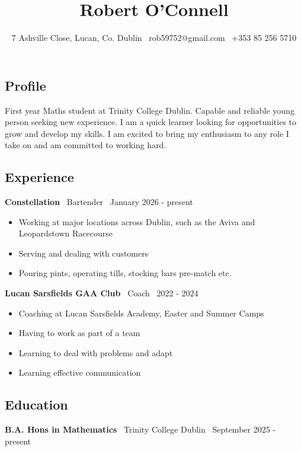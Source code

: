 \documentclass{article}
\title{\textbf{Robert O'Connell}}
\author{7 Ashville Close, Lucan, Co. Dublin \textbar \ rob59752@gmail.com \textbar \ +353 85 256 5710}
\date{}
\begin{document}
\maketitle

\subsection*{Profile}
First year Maths student at Trinity College Dublin. Capable and reliable young person seeking new experience. 
I am a quick learner looking for opportunities to grow and develop my skills. 
I am excited to bring my enthusiasm to any role I take on and am committed to working hard.

\subsection*{Experience}

\begin{small}
\textbf{Constellation} \textbar \ Bartender \textbar \ January 2026 - present
    \begin{itemize}
        \item Working at major locations across Dublin, such as the Aviva and Leopardstown Racecourse
        \item Serving and dealing with customers
        \item Pouring pints, operating tills, stocking bars pre-match etc.
    \end{itemize}
    
    \textbf{Lucan Sarsfields GAA Club} \textbar \ Coach \textbar \ 2022 - 2024
    
    \begin{itemize}
        \item Coaching at Lucan Sarsfields Academy, Easter and Summer Camps
        \item Having to work as part of a team 
        \item Learning to deal with problems and adapt
        \item Learning effective communication
    \end{itemize}
    
\end{small}

\subsection*{Education}
\textbf{B.A. Hons in Mathematics} \textbar \ Trinity College Dublin \textbar \ September 2025 - present
\end{document}
